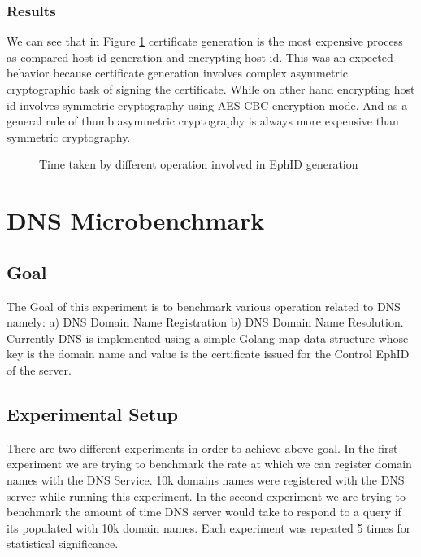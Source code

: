 \subsubsection{Results}
We can see that in Figure \ref{fig:perf_ephid} certificate generation is the most expensive process as compared host id generation and encrypting host id. This was an expected behavior because certificate generation involves complex asymmetric cryptographic task of signing the certificate. While on other hand encrypting host id involves symmetric cryptography using AES-CBC encryption mode. And as a general rule of thumb asymmetric cryptography is always more expensive than symmetric cryptography.
\begin{figure}[th!!]
\centering
\noindent
{}
\decoRule
\caption[EphID Generation Ops]{Time taken by different operation involved in EphID generation}
\label{fig:perf_ephid}
\end{figure}

\section{DNS Microbenchmark}

\subsection{Goal}
The Goal of this experiment is to benchmark various operation related to DNS namely: a) DNS Domain Name Registration b) DNS Domain Name Resolution. Currently DNS is implemented using a simple Golang map data structure whose key is the domain name and value is the certificate issued for the Control EphID of the server.

\subsection{Experimental Setup}
There are two different experiments in order to achieve above goal. In the first experiment we are trying to benchmark the rate at which we can register domain names with the DNS Service. 10k domains names were registered with the DNS server while running this experiment. In the second experiment we are trying to benchmark the amount of time DNS server would take to respond to a query if its populated with 10k domain names. Each experiment was repeated 5 times for statistical significance.
